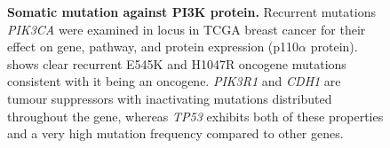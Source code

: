 \begin{figure}[!ht]
\begin{mdframed}
\begin{center}
    \end{center}
    \caption[Somatic mutation against PI3K protein]{\small \textbf{Somatic mutation against PI3K protein.} Recurrent mutations \textit{PIK3CA} were examined in locus in TCGA breast cancer for their effect on gene, pathway, and protein expression (p110$\alpha$ protein). shows clear recurrent E545K and H1047R oncogene mutations consistent with it being an oncogene. \textit{PIK3R1} and \textit{CDH1} are tumour suppressors with inactivating mutations distributed throughout the gene, whereas \textit{TP53} exhibits both of these properties and a very high mutation frequency compared to other genes.
}
\label{fig:mutation_expr_prot}
\end{mdframed}
\end{figure}

